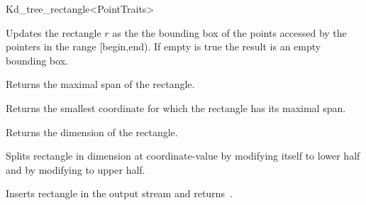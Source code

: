 \begin{ccRefClass}{Kd_tree_rectangle<PointTraits>}
\begin{ccAdvanced}
{Updates the rectangle $r$ as the the bounding box of the points accessed by the pointers
 in the range [begin,end). If empty is true the result is an empty bounding box.} 
 
{Returns the maximal span of the rectangle.}

{Returns the smallest coordinate for which the rectangle has its maximal span.}

{Returns the dimension of the rectangle.}

{Splits rectangle in dimension  at coordinate-value  
 by modifying itself to lower half and by modifying  to upper half.} 


{Inserts rectangle  in the output stream  and returns~.}


\end{ccAdvanced}


\end{ccRefClass}


